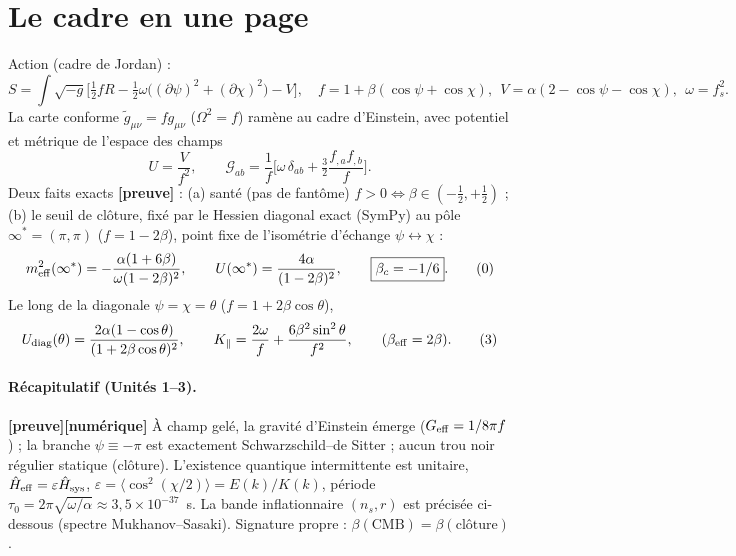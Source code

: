 \documentclass[11pt,a4paper]{article}
\newcommand{\st}[1]{\textbf{\textcolor{blue!45!black}{[#1]}}}
\newcommand{\fpole}{\infty^*}
\begin{document}
\section{Le cadre en une page}
Action (cadre de Jordan) :
\begin{equation}
S=\int\!\sqrt{-g}\Big[\tfrac12 f R-\tfrac12\omega\big((\partial\psi)^2+(\partial\chi)^2\big)-V\Big],\quad
f=1+\beta(\cos\psi+\cos\chi),\ \ V=\alpha(2-\cos\psi-\cos\chi),\ \ \omega=f_s^2. \tag{1}
\end{equation}
La carte conforme $\tilde g_{\mu\nu}=f g_{\mu\nu}$ ($\Omega^2=f$) ramène au cadre d'Einstein, avec potentiel et métrique de l'espace des champs
\begin{equation}
U=\frac{V}{f^2},\qquad \mathcal{G}_{ab}=\frac1f\Big[\omega\,\delta_{ab}+\tfrac32\frac{f_{,a}f_{,b}}{f}\Big]. \tag{2}
\end{equation}
Deux faits exacts \st{preuve} : (a) santé (pas de fantôme) $f>0\Leftrightarrow\beta\in(-\tfrac12,+\tfrac12)$ ; (b) le seuil de clôture, fixé par le Hessien diagonal exact (SymPy) au pôle $\fpole=(\pi,\pi)$ ($f=1-2\beta$), point fixe de l'isométrie d'échange $\psi\leftrightarrow\chi$ :
\begin{equation}
m^2_{\rm eff}(\fpole)=-\frac{\alpha(1+6\beta)}{\omega(1-2\beta)^2},\qquad U(\fpole)=\frac{4\alpha}{(1-2\beta)^2},\qquad \boxed{\beta_c=-1/6}. \tag{0}
\end{equation}
Le long de la diagonale $\psi=\chi=\theta$ ($f=1+2\beta\cos\theta$),
\begin{equation}
U_{\rm diag}(\theta)=\frac{2\alpha(1-\cos\theta)}{(1+2\beta\cos\theta)^2},\qquad
K_\parallel=\frac{2\omega}{f}+\frac{6\beta^2\sin^2\theta}{f^2},\qquad(\beta_{\rm eff}=2\beta). \tag{3}
\end{equation}

\paragraph{Récapitulatif (Unités 1–3).}
\st{preuve}\st{numérique} À champ gelé, la gravité d'Einstein émerge ($G_{\rm eff}=1/8\pi f$) ; la branche $\psi\equiv-\pi$ est exactement Schwarzschild–de Sitter ; aucun trou noir régulier statique (clôture). L'existence quantique intermittente est unitaire, $\hat H_{\rm eff}=\varepsilon\hat H_{\rm sys}$, $\varepsilon=\langle\cos^2(\chi/2)\rangle=E(k)/K(k)$, période $\tau_0=2\pi\sqrt{\omega/\alpha}\approx3{,}5\times10^{-37}$~s. La bande inflationnaire $(n_s,r)$ est précisée ci-dessous (spectre Mukhanov–Sasaki). Signature propre : $\beta(\text{CMB})=\beta(\text{clôture})$.
\end{document}
